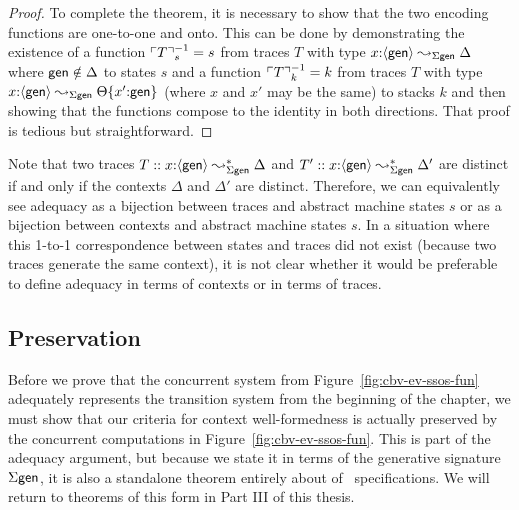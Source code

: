\begin{proof}
To complete the theorem, it is necessary to show that the two encoding
functions are one-to-one and onto. This can be done by demonstrating
the existence of a function $^{-1}_s = s$ from traces $T$
with type $x{:} \leadsto_{\Sigma\sf gen} \Delta$ where
${\sf gen} \notin \Delta$ to states $s$ and a function
$^{-1}_k = k$ from traces $T$ with type $x{:}
\leadsto_{\Sigma\sf gen} $ (where $x$
and $x'$ may be the same) to stacks $k$ and then showing that
the functions compose to the identity in both directions. 
That proof is tedious but straightforward.
\end{proof}

Note that two traces $T :: x{:} \leadsto^*_{\Sigma\sf
  gen} \Delta$ and $T' :: x{:} \leadsto^*_{\Sigma\sf
  gen} \Delta'$ are distinct if and only if the contexts $\Delta$ and
$\Delta'$ are distinct. Therefore, we can equivalently see adequacy as
a bijection between traces and abstract machine states $s$ or as a
bijection between contexts and abstract machine states $s$. In a
situation where this 1-to-1 correspondence between states and traces
did not exist (because two traces generate the same context), it is
not clear whether it would be preferable to define adequacy in
terms of contexts or in terms of traces.

\subsection{Preservation}
\label{sec:nat-ssos-adequacy-pres}

Before we prove that the concurrent system from
Figure~\ref{fig:cbv-ev-ssos-fun} adequately represents the transition
system from the beginning of the chapter, we must show that our
criteria for context well-formedness is actually preserved by the
concurrent computations in Figure~\ref{fig:cbv-ev-ssos-fun}. This is
part of the adequacy argument, but because we state it in terms of the
generative signature $\Sigma\sf gen$, it is also a 
standalone theorem entirely about of \sls~specifications. We will
return to theorems of this form in Part III of this thesis.

